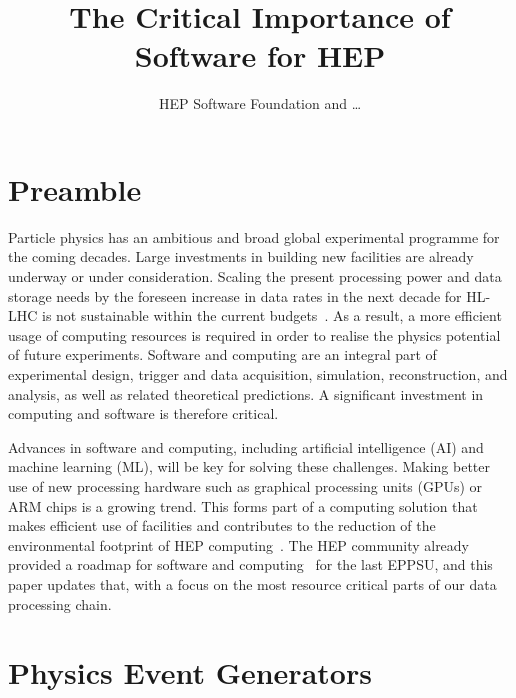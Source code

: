 \documentclass[10pt,a4paper]{article}
\begin{document}

\title{The Critical Importance of Software for HEP}

\author{HEP Software Foundation and \dots}

\maketitle


\newpage

\section{Preamble}\label{preamble}

Particle physics has an ambitious and broad global experimental programme for
the coming decades. Large investments in building new facilities are already
underway or under consideration. Scaling the present processing power and data
storage needs by the foreseen increase in data rates in the next decade for
HL-LHC is not sustainable within the current
budgets~\cite{CERN-LHCC-2022-005,Software:2815292}. As a result, a more
efficient usage of computing resources is required in order to realise the
physics potential of future experiments. Software and computing are an integral
part of experimental design, trigger and data acquisition, simulation,
reconstruction, and analysis, as well as related theoretical predictions. A
significant investment in computing and software is therefore critical.

Advances in software and computing, including artificial intelligence (AI) and
machine learning (ML), will be key for solving these challenges. Making better
use of new processing hardware such as graphical processing units (GPUs) or ARM
chips is a growing trend. This forms part of a computing solution that makes
efficient use of facilities and contributes to the reduction of the
environmental footprint of HEP computing~\cite{wlcgsust}. The HEP community
already provided a roadmap for software and computing~\cite{hsfcwp} for the last
EPPSU, and this paper updates that, with a focus on the most resource critical
parts of our data processing chain.

\section{Physics Event Generators}\label{physics-event-generators}
\end{document}
